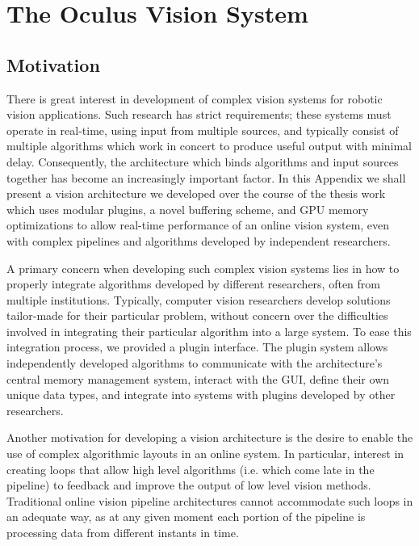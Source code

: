 \graphicspath{{figures/Oculus/}}

\chapter{The Oculus Vision System}
\label{chap:Oculus}
\section{Motivation}
There is great interest in development of complex vision systems for robotic vision applications. Such research has strict requirements; these systems must operate in real-time, using input from multiple sources, and typically consist of multiple algorithms which work in concert to produce useful output with minimal delay. Consequently, the architecture which binds algorithms and input sources together has become an increasingly important factor. In this Appendix we shall present a vision architecture we developed over the course of the thesis work which uses modular plugins, a novel buffering scheme, and GPU memory optimizations to allow real-time performance of an online vision system, even with complex pipelines and algorithms developed by independent researchers.

A primary concern when developing such complex vision systems lies in how to properly integrate algorithms developed by different researchers, often from multiple institutions. Typically, computer vision researchers develop solutions tailor-made for their particular problem, without concern over the difficulties involved in integrating their particular algorithm into a large system. To ease this integration process, we provided a plugin interface. The plugin system allows independently developed algorithms to communicate with the architecture's central memory management system, interact with the GUI, define their own unique data types, and integrate into systems with plugins developed by other researchers.

Another motivation for developing a vision architecture is the desire to enable the use of complex algorithmic layouts in an online system. In particular, interest in creating loops that allow high level algorithms (i.e. which come late in the pipeline) to feedback and improve the output of low level vision methods. Traditional online vision pipeline architectures cannot accommodate such loops in an adequate way, as at any given moment each portion of the pipeline is processing data from different instants in time. 

